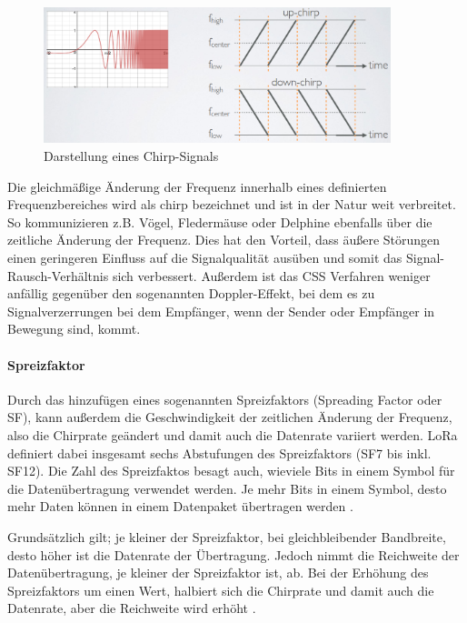 \begin{figure}[h]
 \centering
 \includegraphics[width=0.9\textwidth]{pictures/chirp-sf}
 \caption[Darstellung eines Chirp-Signals]{Darstellung eines Chirp-Signals \cite{lora2022}}
 \label{fig:css}
\end{figure}

Die gleichmäßige Änderung der Frequenz innerhalb eines definierten Frequenzbereiches wird als chirp bezeichnet und ist in der Natur weit verbreitet. So kommunizieren z.B. Vögel, Fledermäuse oder Delphine ebenfalls über die zeitliche Änderung der Frequenz. Dies hat den Vorteil, dass äußere Störungen einen geringeren Einfluss auf die Signalqualität ausüben und somit das Signal-Rausch-Verhältnis sich verbessert. Außerdem ist das CSS Verfahren weniger anfällig gegenüber den sogenannten Doppler-Effekt, bei dem es zu Signalverzerrungen bei dem Empfänger, wenn der Sender oder Empfänger in Bewegung sind, kommt. 

\paragraph{Spreizfaktor}

Durch das hinzufügen eines sogenannten Spreizfaktors (Spreading Factor oder SF), kann außerdem die Geschwindigkeit der zeitlichen Änderung der Frequenz, also die Chirprate geändert und damit auch die Datenrate variiert werden. LoRa definiert dabei insgesamt sechs Abstufungen des Spreizfaktors (SF7 bis inkl. SF12). Die Zahl des Spreizfaktos besagt auch, wieviele Bits in einem Symbol für die Datenübertragung verwendet werden. Je mehr Bits in einem Symbol, desto mehr Daten können in einem Datenpaket übertragen werden \cite{sf2017}. 

Grundsätzlich gilt; je kleiner der Spreizfaktor, bei gleichbleibender Bandbreite, desto höher ist die Datenrate der Übertragung. Jedoch nimmt die Reichweite der Datenübertragung, je kleiner der Spreizfaktor ist, ab. Bei der Erhöhung des Spreizfaktors um einen Wert, halbiert sich die Chirprate und damit auch die Datenrate, aber die Reichweite wird erhöht \cite{sf2022}. 

